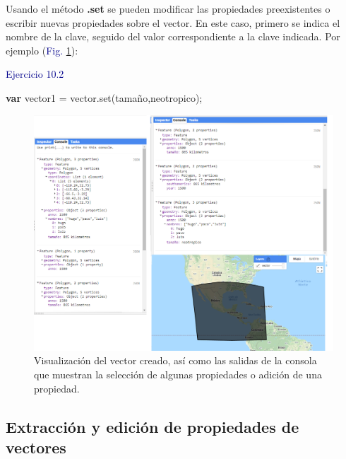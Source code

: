 \documentclass[
  12pt,
  letterpaper,
  twoside]{book}
\newenvironment{Shaded}{\begin{snugshade}}{\end{snugshade}}
\newcommand{\ControlFlowTok}[1]{\textcolor[rgb]{0.00,0.00,0.00}{\textbf{#1}}}
\newcommand{\FunctionTok}[1]{\textcolor[rgb]{0.48,0.12,0.64}{#1}}
\newcommand{\NormalTok}[1]{#1}
\newcommand{\OperatorTok}[1]{\textcolor[rgb]{0.00,0.00,0.00}{#1}}
\newcommand{\StringTok}[1]{\textcolor[rgb]{0.87,0.29,0.22}{#1}}
\newcommand\boldpurple[1]{\textcolor{darkpurple}{\textbf{#1}}}
\begin{document}
Usando el método \boldpurple{.set} se pueden modificar las propiedades preexistentes o escribir nuevas propiedades sobre el vector. En este caso, primero se indica el nombre de la clave, seguido del valor correspondiente a la clave indicada. Por ejemplo (\textcolor{darkblue}{Fig.} \ref{fig:f71}):

\textcolor{darkblue}{Ejercicio 10.2}

\begin{Shaded}
\begin{Highlighting}[]
\ControlFlowTok{var}\NormalTok{ vector1 }\OperatorTok{=}\NormalTok{ vector}\OperatorTok{.}\FunctionTok{set}\NormalTok{(}\StringTok{\textquotesingle{}tamaño\textquotesingle{}}\OperatorTok{,}\StringTok{\textquotesingle{}neotropico\textquotesingle{}}\NormalTok{)}\OperatorTok{;}
\end{Highlighting}
\end{Shaded}

\begin{figure}[H]

{\centering \includegraphics[width=0.95\linewidth]{Img/ej10} 

}

\caption{Visualización del vector creado, así como las salidas de la consola que muestran la selección de algunas propiedades o adición de una propiedad.}\label{fig:f71}
\end{figure}

\hypertarget{extracciuxf3n-y-ediciuxf3n-de-propiedades-de-vectores}{%
\subsection*{Extracción y edición de propiedades de vectores}\label{extracciuxf3n-y-ediciuxf3n-de-propiedades-de-vectores}}
\end{document}
